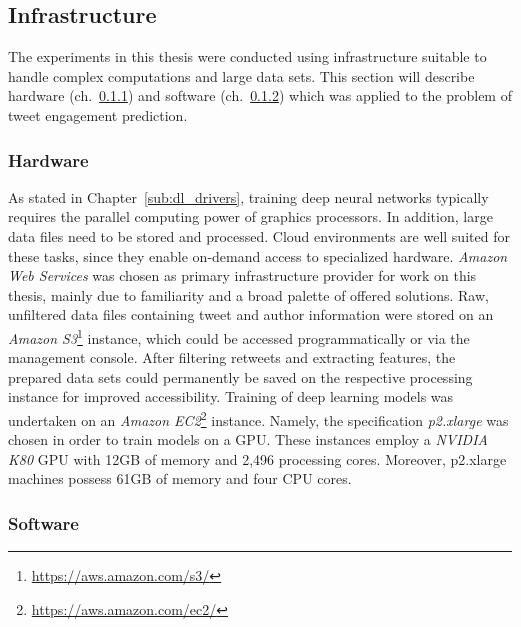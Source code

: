 \subsection{Infrastructure}
\label{sec:infrastructure}

The experiments in this thesis were conducted using infrastructure suitable
to handle complex computations and large data sets.
This section will describe hardware (ch.~\ref{sub:meth_hardware}) and software
(ch.~\ref{sub:meth_software}) which was applied to the problem of tweet
engagement prediction.

\subsubsection{Hardware}
\label{sub:meth_hardware}

As stated in Chapter~\ref{sub:dl_drivers}, training deep neural networks
typically requires the parallel computing power of graphics processors.
In addition, large data files need to be stored and processed.
Cloud environments are well suited for these tasks, since they enable on-demand 
access to specialized hardware.
\textit{Amazon Web Services} was chosen as primary infrastructure provider for 
work on this thesis, mainly due to familiarity and a broad palette of offered
solutions.
Raw, unfiltered data files containing tweet and author information were stored
on an \textit{Amazon S3}\footnote{\url{https://aws.amazon.com/s3/}} instance,
which could be accessed programmatically or via the management console.
After filtering retweets and extracting features, the prepared data sets could
permanently be saved on the respective processing instance for improved
accessibility.
Training of deep learning models was undertaken on an \textit{Amazon EC2}\footnote{\url{https://aws.amazon.com/ec2/}}
instance.
Namely, the specification \textit{p2.xlarge} was chosen in order to train models
on a GPU.
These instances employ a \textit{NVIDIA K80} GPU with 12GB of memory and 2,496
processing cores.
Moreover, p2.xlarge machines possess 61GB of memory and four CPU cores.

\subsubsection{Software}
\label{sub:meth_software}


